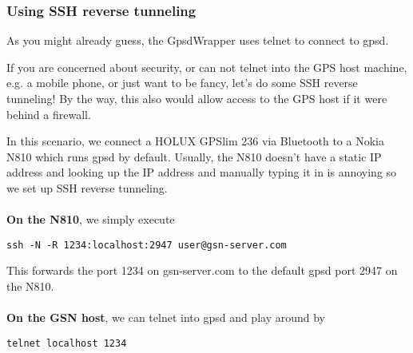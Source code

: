 \subsubsection{Using SSH reverse tunneling}
As you might already guess, the GpsdWrapper uses telnet to connect to gpsd. 

If you are concerned about security, or can not telnet into the GPS host machine, e.g. a mobile phone, or just want to be fancy, let's do some SSH reverse tunneling! By the way, this also would allow access to the GPS host if it were behind a firewall.

In this scenario, we connect a HOLUX GPSlim 236 via Bluetooth to a Nokia N810 which runs gpsd by default. Usually, the N810 doesn't have a static IP address and looking up the IP address and manually typing it in is annoying so we set up SSH reverse tunneling.\\
\\
\textbf{On the N810}, we simply execute 
\begin{verbatim}
ssh -N -R 1234:localhost:2947 user@gsn-server.com
\end{verbatim}
This forwards the port 1234 on gsn-server.com to the default gpsd port 2947 on the N810.\\
\\
\textbf{On the GSN host}, we can telnet into gpsd and play around by
\begin{verbatim}
telnet localhost 1234
\end{verbatim}

